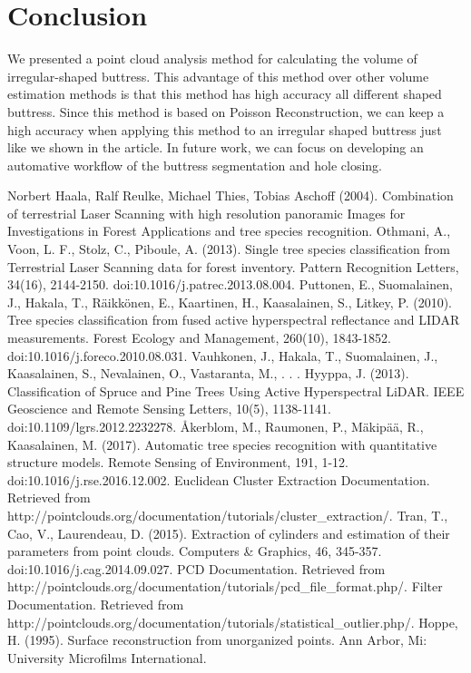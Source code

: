 \documentclass[runningheads,a4paper]{llncs}
\begin{document}
\section{Conclusion}
We presented a point cloud analysis method for calculating the volume of irregular-shaped buttress. This advantage of this method over other volume estimation methods is that this method has high accuracy all different shaped buttress. Since this method is based on Poisson Reconstruction, we can keep a high accuracy when applying this method to an irregular shaped buttress just like we shown in the article. In future work, we can focus on developing an automative workflow of the buttress segmentation and hole closing.
\begin{thebibliography}{4}

Norbert Haala, Ralf Reulke, Michael Thies, Tobias Aschoff (2004). Combination of terrestrial Laser Scanning with high resolution panoramic Images for Investigations in Forest Applications and tree species recognition.
Othmani, A., Voon, L. F., Stolz, C., Piboule, A. (2013). Single tree species classification from Terrestrial Laser Scanning data for forest inventory. Pattern Recognition Letters, 34(16), 2144-2150. doi:10.1016/j.patrec.2013.08.004.
Puttonen, E., Suomalainen, J., Hakala, T., Räikkönen, E., Kaartinen, H., Kaasalainen, S., Litkey, P. (2010). Tree species classification from fused active hyperspectral reflectance and LIDAR measurements. Forest Ecology and Management, 260(10), 1843-1852. doi:10.1016/j.foreco.2010.08.031.
Vauhkonen, J., Hakala, T., Suomalainen, J., Kaasalainen, S., Nevalainen, O., Vastaranta, M., . . . Hyyppa, J. (2013). Classification of Spruce and Pine Trees Using Active Hyperspectral LiDAR. IEEE Geoscience and Remote Sensing Letters, 10(5), 1138-1141. doi:10.1109/lgrs.2012.2232278.
Åkerblom, M., Raumonen, P., Mäkipää, R., Kaasalainen, M. (2017). Automatic tree species recognition with quantitative structure models. Remote Sensing of Environment, 191, 1-12. doi:10.1016/j.rse.2016.12.002.
Euclidean Cluster Extraction Documentation. Retrieved from http://pointclouds.org/documentation/tutorials/cluster\_extraction/.
Tran, T., Cao, V., Laurendeau, D. (2015). Extraction of cylinders and estimation of their parameters from point clouds. Computers \& Graphics, 46, 345-357. doi:10.1016/j.cag.2014.09.027.
PCD Documentation. Retrieved from http://pointclouds.org/documentation/tutorials/pcd\_file\_format.php/.
 Filter Documentation. Retrieved from http://pointclouds.org/documentation/tutorials/statistical\_outlier.php/.
 Hoppe, H. (1995). Surface reconstruction from unorganized points. Ann Arbor, Mi: University Microfilms International.
\end{thebibliography}
\end{document}
